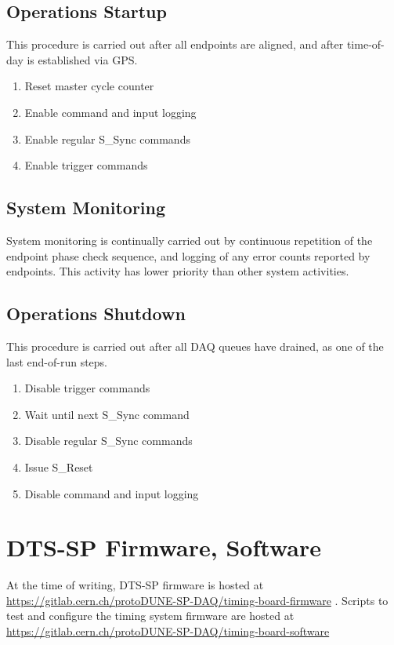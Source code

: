 \documentclass[a4paper,11pt]{article}
\begin{document}
\subsection{Operations Startup}

This procedure is carried out after all endpoints are aligned, and after time-of-day is established via GPS.

\begin{enumerate}
	\item Reset master cycle counter
	\item Enable command and input logging
	\item Enable regular S\_Sync commands
	\item Enable trigger commands
\end{enumerate}

\subsection{System Monitoring}

System monitoring is continually carried out by continuous repetition of the endpoint phase check sequence, and logging of any error counts reported by endpoints. This activity has lower priority than other system activities.

\subsection{Operations Shutdown}

This procedure is carried out after all DAQ queues have drained, as one of the last end-of-run steps.

\begin{enumerate} 
	\item Disable trigger commands
	\item Wait until next S\_Sync command
	\item Disable regular S\_Sync commands
	\item Issue S\_Reset
	\item Disable command and input logging
\end{enumerate}

\clearpage

\appendix

\section{DTS-SP Firmware, Software}

At the time of writing, DTS-SP firmware is hosted at \url{https://gitlab.cern.ch/protoDUNE-SP-DAQ/timing-board-firmware} . Scripts to test and configure the timing system firmware are hosted at \url{https://gitlab.cern.ch/protoDUNE-SP-DAQ/timing-board-software}
\end{document}

